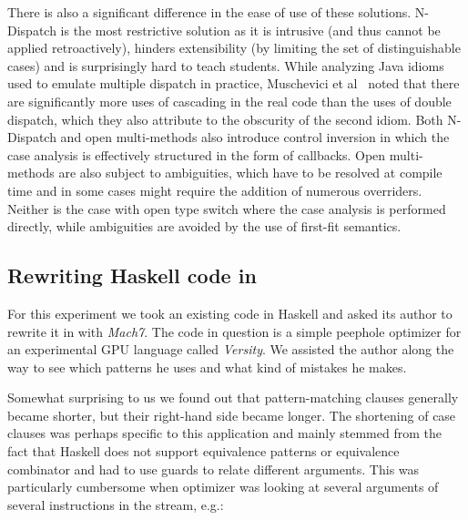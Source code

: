 There is also a significant difference in the ease of use of these solutions. 
N-Dispatch is the most restrictive solution as it is intrusive (and thus cannot 
be applied retroactively), hinders extensibility (by limiting the set of 
distinguishable cases) and is surprisingly hard to teach students. While 
analyzing Java idioms used to emulate multiple dispatch in practice, Muschevici 
et al~\cite[Figure 13]{MPTN08} noted that there are significantly more uses of 
cascading  in the real code than the uses of double dispatch, 
which they also attribute to the obscurity of the second idiom. Both N-Dispatch 
and open multi-methods also introduce control inversion in which the case 
analysis is effectively structured in the form of callbacks. Open multi-methods 
are also subject to ambiguities, which have to be resolved at compile time and 
in some cases might require the addition of numerous overriders. Neither is the 
case with open type switch where the case analysis is performed directly, while 
ambiguities are avoided by the use of first-fit semantics.



\subsection{Rewriting Haskell code in \Cpp{}}
\label{sec:qualcmp}

For this experiment we took an existing code in Haskell and asked its author to 
rewrite it in \Cpp{} with \emph{Mach7}. The code in question is a simple 
peephole optimizer for an experimental GPU language called 
\emph{Versity}. We assisted the author along the way to see which 
patterns he uses and what kind of mistakes he makes.

Somewhat surprising to us we found out that pattern-matching clauses generally 
became shorter, but their right-hand side became longer. The shortening of case 
clauses was perhaps specific to this application and mainly stemmed from the 
fact that Haskell does not support equivalence patterns or equivalence 
combinator and had to use guards to relate different arguments. This was 
particularly cumbersome when optimizer was looking at several arguments of 
several instructions in the stream, e.g.:


